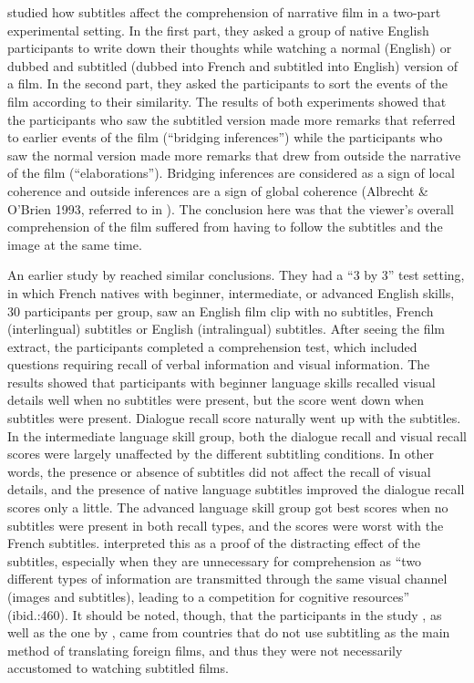 \documentclass[output=paper]{langsci/langscibook}
\begin{document}
\citet{lee2013} studied how subtitles affect the comprehension of narrative film in a two-part experimental setting. In the first part, they asked a group of native English participants to write down their thoughts while watching a normal (English) or dubbed and subtitled (dubbed into French and subtitled into English) version of a film. In the second part, they asked the participants to sort the events of the film according to their similarity. The results of both experiments showed that the participants who saw the subtitled version made more remarks that referred to earlier events of the film (``bridging inferences'') while the participants who saw the normal version made more remarks that drew from outside the narrative of the film (``elaborations''). Bridging inferences are considered as a sign of local coherence and outside inferences are a sign of global coherence (Albrecht \& O'Brien 1993, referred to in \citealt{lee2013}). The conclusion here was that the viewer's overall comprehension of the film suffered from having to follow the subtitles and the image at the same time.

An earlier study by \citet{lavaur2011} reached similar conclusions. They had a ``3 by 3'' test setting, in which French natives with beginner, intermediate, or advanced English skills, 30 participants per group, saw an English film clip with no subtitles, French (interlingual) subtitles or English (intralingual) subtitles. After seeing the film extract, the participants completed a comprehension test, which included questions requiring recall of verbal information and visual information. The results showed that participants with beginner language skills recalled visual details well when no subtitles were present, but the score went down when subtitles were present. Dialogue recall score naturally went up with the subtitles. In the intermediate language skill group, both the dialogue recall and visual recall scores were largely unaffected by the different subtitling conditions. In other words, the presence or absence of subtitles did not affect the recall of visual details, and the presence of native language subtitles improved the dialogue recall scores only a little. The advanced language skill group got best scores when no subtitles were present in both recall types, and the scores were worst with the French subtitles. \citet{lavaur2011} interpreted this as a proof of the distracting effect of the subtitles, especially when they are unnecessary for comprehension as ``two different types of information are transmitted through the same visual channel (images and subtitles), leading to a competition for cognitive resources'' (ibid.:460). It should be noted, though, that the participants in the study \citet{lavaur2011}, as well as the one by \citet{lee2013}, came from countries that do not use subtitling as the main method of translating foreign films, and thus they were not necessarily accustomed to watching subtitled films. 
\end{document}
